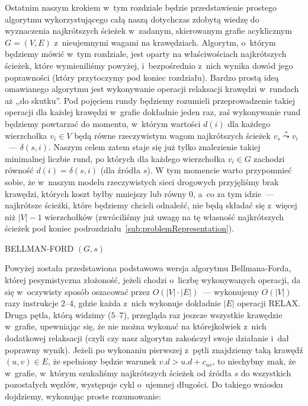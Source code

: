 Ostatnim naszym krokiem w~tym rozdziale będzie przedstawienie prostego algorytmu wykorzystującego całą naszą dotychczas zdobytą wiedzę do wyznaczenia najkrótszych ścieżek w~zadanym, skierowanym grafie acyklicznym $G = \left( V, E \right)$ z~nieujemnymi wagami na krawędziach.
Algorytm, o~którym będziemy mówić w~tym rozdziale, jest oparty na właściwościach najkrótszych ścieżek, które wymieniliśmy powyżej, i~bezpośrednio z~nich wynika dowód jego poprawności (który przytoczymy pod koniec rozdziału).
Bardzo prostą ideą omawianego algorytmu jest wykonywanie operacji relaksacji krawędzi w~rundach aż ,,do skutku''.
Pod pojęciem rundy będziemy rozumieli przeprowadzenie takiej operacji dla każdej krawędzi w~grafie dokładnie jeden raz, zaś wykonywanie rund będziemy powtarzać do momentu, w~którym wartości $d \left( i \right)$ dla każdego wierzchołka $v_{i} \in V$ będą równe rzeczywistym wagom najkrótszych ścieżek $v_{s} \overset{*}\leadsto v_{i}$~--- $\delta \left( s,i \right)$.
Naszym celem zatem staje się już tylko znalezienie takiej minimalnej liczbie rund, po których dla każdego wierzchołka $v_{i} \in G$ zachodzi równość $d \left( i \right) = \delta \left( s, i \right)$ (dla źródła $s$).
W tym momencie warto przypomnieć sobie, że w~naszym modelu rzeczywistych sieci drogowych przyjęliśmy brak krawędzi, których koszt byłby mniejszy lub równy $0$, a~co za tym idzie~--- najkrótsze ścieżki, które będziemy chcieli odnaleźć, nie będą składać się z~więcej niż $\left| V \right| - 1$ wierzchołków (zwróciliśmy już uwagę na tę własność najkrótszych ścieżek pod koniec podrozdziału~\ref{sub:problemRepresentation}).

\begin{pseudokod}[!htbp]
	\DontPrintSemicolon
	\caption{
		BELLMAN-FORD $\left( G, s \right)$
	}
	\label{alg:BellmanFord}
\end{pseudokod}

Powyżej została przedstawiona podstawowa wersja algorytmu Bellmana-Forda, której pesymistyczna złożoność, jeżeli chodzi o~liczbę wykonywanych operacji, da się w~oczywisty sposób oszacować przez $O \left( \left| V \right| \cdot \left| E \right| \right)$~--- wykonujemy $O \left( \left| V \right| \right)$ razy instrukcje $2$--$4$, gdzie każda z~nich wykonuje dokładnie $\left| E \right|$ operacji \textsf{RELAX}.
Druga pętla, którą widzimy ($5$--$7$), przegląda raz jeszcze wszystkie krawędzie w~grafie, upewniając się, że nie można wykonać na którejkolwiek z~nich dodatkowej relaksacji (czyli czy nasz algorytm zakończył swoje działanie i~dał poprawny wynik).
Jeżeli po wykonaniu pierwszej z~pętli znajdziemy taką krawędź $\left( u, v \right) \in E$, że spełniony będzie warunek $v.d > u.d + c_{uv}$, to niechybny znak, że w~grafie, w~którym szukaliśmy najkrótszych ścieżek od źródła $s$ do wszystkich pozostałych węzłów, występuje cykl o~ujemnej długości.
Do takiego wniosku dojdziemy, wykonując proste rozumowanie:

